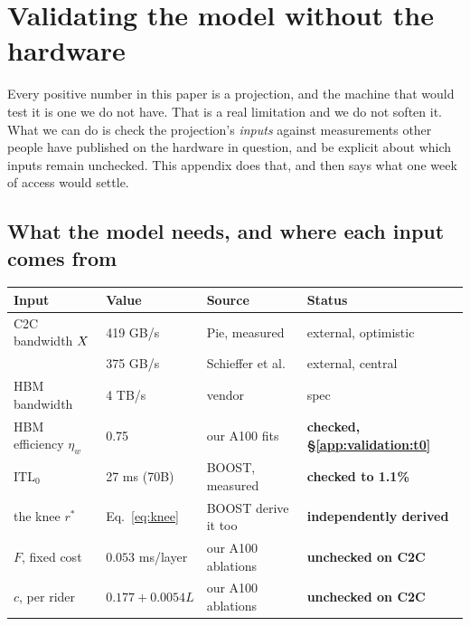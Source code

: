 %
%

\section{Validating the model without the hardware}
\label{app:validation}

Every positive number in this paper is a projection, and the machine that would
test it is one we do not have. That is a real limitation and we do not soften it.
What we can do is check the projection's \emph{inputs} against measurements other
people have published on the hardware in question, and be explicit about which
inputs remain unchecked. This appendix does that, and then says what one week of
access would settle.

\subsection{What the model needs, and where each input comes from}

\begin{center}\small
\begin{tabular}{llll}
\toprule
Input & Value & Source & Status \\
\midrule
C2C bandwidth $X$ & 419 GB/s & Pie, measured~\cite{pie} & external, optimistic \\
                       & 375 GB/s & Schieffer et al.~\cite{schieffer2024} & external, central \\
HBM bandwidth & 4 TB/s & vendor & spec \\
HBM efficiency $\eta_w$ & 0.75 & our A100 fits & \textbf{checked, \S\ref{app:validation:t0}} \\
$\mathrm{ITL}_0$ & 27 ms (70B) & BOOST, measured~\cite{boost} & \textbf{checked to 1.1\%} \\
the knee $r^{*}$ & Eq.~\ref{eq:knee} & BOOST derive it too~\cite{boost} & \textbf{independently derived} \\
$F$, fixed cost & $0.053$ ms/layer & our A100 ablations & \textbf{unchecked on C2C} \\
$c$, per rider & $0.177 + 0.0054L$ & our A100 ablations & \textbf{unchecked on C2C} \\
\bottomrule
\end{tabular}
\end{center}

